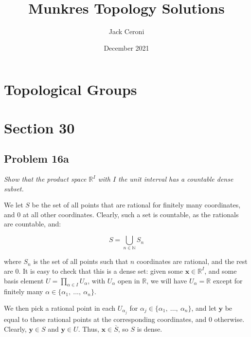 \documentclass[10pt, oneside]{amsart}
\title{Munkres Topology Solutions}
\author{Jack Ceroni}
\date{December 2021}
\newcommand{\bm}{\boldsymbol}
\begin{document}
    \maketitle

    \tableofcontents

    \vspace{.25in}

    \newpage

    \section{Topological Groups}

    \hrulefill

    \hrulefill

    \section{Section 30}

    \hrulefill

    \subsection{Problem 16a} \textit{Show that the product space $\mathbb{R}^{I}$ with $I$ the unit interval has a countable dense subset.}
    \newline

    We let $S$ be the set of all points that are rational for finitely many coordinates, and $0$ at all other coordinates. Clearly, such a set is countable, as
    the rationals are countable, and:

    $$S = \displaystyle\bigcup_{n \in \mathbb{N}} S_n$$

    where $S_n$ is the set of all points such that $n$ coordinates are rational, and the rest are $0$. It is easy to check that
    this is a dense set: given some $\bm{x} \in \mathbb{R}^{I}$, and some basis element $U = \prod_{\alpha \in I} U_{\alpha}$, with $U_{\alpha}$
    open in $\mathbb{R}$, we will have $U_{\alpha} = \mathbb{R}$ except for finitely many $\alpha \in \{\alpha_1, \ ..., \ \alpha_n\}$.
    \newline

    We then pick a rational point in each $U_{\alpha_j}$ for $\alpha_j \in \{\alpha_1, \ ..., \ \alpha_n\}$, and let $\bm{y}$ be
    equal to these rational points at the corresponding coordinates, and $0$ otherwise. Clearly, $\bm{y} \in S$ and $\bm{y} \in U$. Thus,
    $\bm{x} \in \overline{S}$, so $S$ is dense.
\end{document}
